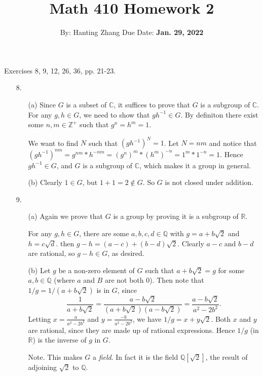 \documentclass{article}
\title{\textbf{Math 410 Homework 2}}
\author{By: Hanting Zhang \hspace{5mm} Due Date: \textbf{Jan. 29, 2022}}
\date{}
\begin{document}
\maketitle

Exercises 8, 9, 12, 26, 36, pp. 21-23.

\begin{enumerate}
    \item [8.] 
    \begin{enumerate}
        \item [(a)] Since $G$ is a subset of $\mathbb C$, it suffices to prove that $G$ is a subgroup of $\mathbb C$. For any $g, h \in G$, we need to show that $gh^{-1} \in G$. By definiton there exist some $n, m \in \mathbb Z^+$ such that $g^n = h^m = 1$. 
        
        We want to find $N$ such that $(gh^{-1})^N = 1$. Let $N = nm$ and notice that $(gh^{-1})^{nm} = g^{nm} * h^{-nm} = (g^n)^m * (h^m)^{-n} = 1^m * 1 ^{-n} = 1$. Hence $gh^{-1} \in G$, and $G$ is a subgroup of $\mathbb C$, which makes it a group in general.
        \item [(b)] Clearly $1 \in G$, but $1 + 1 = 2 \notin G$. So $G$ is not closed under addition.
    \end{enumerate}

    \item [9.]
    \begin{enumerate}
        \item [(a)] Again we prove that $G$ is a group by proving it is a subgroup of $\mathbb R$. 
        
        For any $g, h \in G$, there are some $a, b, c, d \in \mathbb Q$ with $g = a + b \sqrt 2$ and $h = c \sqrt d$. then $g - h = (a - c) + (b - d)\sqrt 2$. Clearly $a - c$ and $b - d$ are rational, so $g - h \in G$, as desired. 

        \item [(b)] Let $g$ be a non-zero element of $G$ such that $a + b \sqrt 2 = g$ for some $a, b \in \mathbb Q$ (where $a$ and $B$ are not both $0$). Then note that $1 / g = 1 / (a + b \sqrt 2)$ is in $G$, since \[\frac 1 {a + b \sqrt 2} = \frac {a - b\sqrt 2} {(a + b \sqrt 2) (a - b \sqrt 2)} = \frac {a - b \sqrt 2} {a^2 - 2b^2}.\] Letting $x = \frac a {a^2 - 2b^2}$ and $y = \frac {-b} {a^2 - 2b^2}$, we have $1 / g = x + y \sqrt 2$. 
        Both $x$ and $y$ are rational, since they are made up of rational expressions. Hence $1 / g$ (in $\mathbb R$) is the inverse of $g$ in $G$. 

        \item[Note.] This makes $G$ a \textit{field}. In fact it is the field $\mathbb Q[\sqrt 2]$, the result of adjoining $\sqrt 2$ to $\mathbb Q$. 
    \end{enumerate}
    

\end{enumerate}
\end{document}
